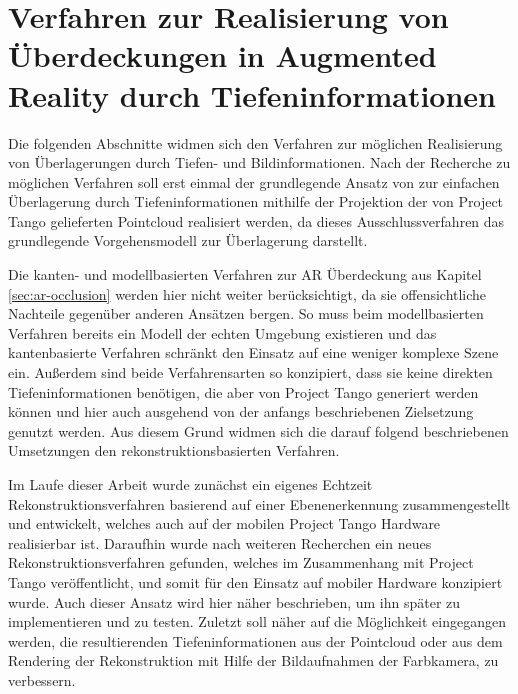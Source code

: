 \chapter{Verfahren zur Realisierung von Überdeckungen in Augmented Reality durch Tiefen\-informationen} \label{sec:optimization}


Die folgenden Abschnitte widmen sich den Verfahren zur möglichen Realisierung von Überlagerungen durch Tiefen- und Bildinformationen. Nach der Recherche zu möglichen Verfahren soll erst einmal der grundlegende Ansatz von \citet{wloka1995resolving} zur einfachen Überlagerung durch Tiefeninformationen mithilfe der Projektion der von Project Tango gelieferten Pointcloud realisiert werden, da dieses Ausschlussverfahren das grundlegende Vorgehensmodell zur Überlagerung darstellt. 

Die kanten- und modellbasierten Verfahren zur AR Überdeckung aus Kapitel \ref{sec:ar-occlusion} werden hier nicht weiter berücksichtigt, da sie offensichtliche Nachteile gegenüber anderen Ansätzen bergen. So muss beim modellbasierten Verfahren bereits ein Modell der echten Umgebung existieren und das kantenbasierte Verfahren schränkt den Einsatz auf eine weniger komplexe Szene ein. Außerdem sind beide Verfahrensarten so konzipiert, dass sie keine direkten Tiefeninformationen benötigen, die aber von Project Tango generiert werden können und hier auch ausgehend von der anfangs beschriebenen Zielsetzung genutzt werden. Aus diesem Grund widmen sich die darauf folgend beschriebenen Umsetzungen den rekonstruktionsbasierten Verfahren.

Im Laufe dieser Arbeit wurde zunächst ein eigenes Echtzeit Rekonstruktionsverfahren basierend auf einer Ebenenerkennung zusammengestellt und entwickelt, welches auch auf der mobilen Project Tango Hardware realisierbar ist. Daraufhin wurde nach weiteren Recherchen ein neues Rekonstruktionsverfahren gefunden, welches im Zusammenhang mit Project Tango veröffentlicht, und somit für den Einsatz auf mobiler Hardware konzipiert wurde. Auch dieser Ansatz wird hier näher beschrieben, um ihn später zu implementieren und zu testen. Zuletzt soll näher auf die Möglichkeit eingegangen werden, die resultierenden Tiefeninformationen aus der Pointcloud oder aus dem Rendering der Rekonstruktion mit Hilfe der Bildaufnahmen der Farbkamera, zu verbessern. 









